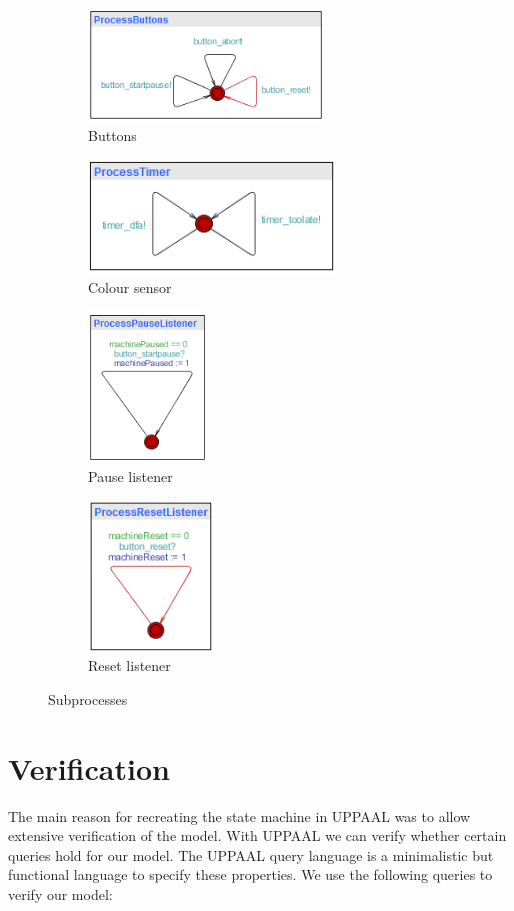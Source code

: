 \documentclass[a4paper,oneside,11pt]{article}
\begin{document}
\begin{figure}[H]
\begin{subfigure}{0.45\textwidth}
\centering
\includegraphics[height=30mm]{processbuttons}
\caption{Buttons}
\end{subfigure}
\hfill
\begin{subfigure}{0.45\textwidth}
\centering
\includegraphics[height=30mm]{processtimer}
\caption{Colour sensor}
\end{subfigure}

\begin{subfigure}{0.45\textwidth}
\centering
\includegraphics[height=40mm]{processpauselistener}
\caption{Pause listener}
\end{subfigure}
\hfill
\begin{subfigure}{0.45\textwidth}
\centering
\includegraphics[height=40mm]{processresetlistener}
\caption{Reset listener}
\end{subfigure}
\caption{Subprocesses}
\end{figure}

\section{Verification}
The main reason for recreating the state machine in UPPAAL was to allow extensive verification of the model. With UPPAAL we can verify whether certain queries hold for our model. The UPPAAL query language is a minimalistic but functional language to specify these properties. We use the following queries to verify our model:
\end{document}
